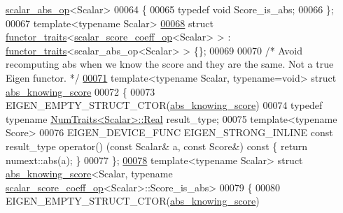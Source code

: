 \begin{DoxyCode}
      \hyperlink{struct_eigen_1_1internal_1_1scalar__abs__op}{scalar\_abs\_op}<Scalar>
00064 \{
00065   \textcolor{keyword}{typedef} \textcolor{keywordtype}{void} Score\_is\_abs;
00066 \};
00067 \textcolor{keyword}{template}<\textcolor{keyword}{typename} Scalar>
\hyperlink{struct_eigen_1_1internal_1_1functor__traits_3_01scalar__score__coeff__op_3_01_scalar_01_4_01_4}{00068} \textcolor{keyword}{struct }\hyperlink{struct_eigen_1_1internal_1_1functor__traits}{functor\_traits}<\hyperlink{struct_eigen_1_1internal_1_1scalar__score__coeff__op}{scalar\_score\_coeff\_op}<Scalar> > : 
      \hyperlink{struct_eigen_1_1internal_1_1functor__traits}{functor\_traits}<scalar\_abs\_op<Scalar> > \{\};
00069 
00070 \textcolor{comment}{/* Avoid recomputing abs when we know the score and they are the same. Not a true Eigen functor.  */}
\hyperlink{struct_eigen_1_1internal_1_1abs__knowing__score}{00071} \textcolor{keyword}{template}<\textcolor{keyword}{typename} Scalar, \textcolor{keyword}{typename}=\textcolor{keywordtype}{void}> \textcolor{keyword}{struct }\hyperlink{struct_eigen_1_1internal_1_1abs__knowing__score}{abs\_knowing\_score}
00072 \{
00073   EIGEN\_EMPTY\_STRUCT\_CTOR(\hyperlink{struct_eigen_1_1internal_1_1abs__knowing__score}{abs\_knowing\_score})
00074   \textcolor{keyword}{typedef} \textcolor{keyword}{typename} \hyperlink{group___core___module_struct_eigen_1_1_num_traits}{NumTraits<Scalar>::Real} result\_type;
00075   \textcolor{keyword}{template}<\textcolor{keyword}{typename} Score>
00076   EIGEN\_DEVICE\_FUNC EIGEN\_STRONG\_INLINE \textcolor{keyword}{const} result\_type operator() (\textcolor{keyword}{const} Scalar& a, \textcolor{keyword}{const} Score&)\textcolor{keyword}{ const }
      \{ \textcolor{keywordflow}{return} numext::abs(a); \}
00077 \};
\hyperlink{struct_eigen_1_1internal_1_1abs__knowing__score_3_01_scalar_00_01typename_01scalar__score__coeff5c3b449f8772ed2666062ac71b9807cd}{00078} \textcolor{keyword}{template}<\textcolor{keyword}{typename} Scalar> \textcolor{keyword}{struct }\hyperlink{struct_eigen_1_1internal_1_1abs__knowing__score}{abs\_knowing\_score}<Scalar, typename 
      \hyperlink{struct_eigen_1_1internal_1_1scalar__score__coeff__op}{scalar\_score\_coeff\_op}<Scalar>::Score\_is\_abs>
00079 \{
00080   EIGEN\_EMPTY\_STRUCT\_CTOR(\hyperlink{struct_eigen_1_1internal_1_1abs__knowing__score}{abs\_knowing\_score})

\end{DoxyCode}
